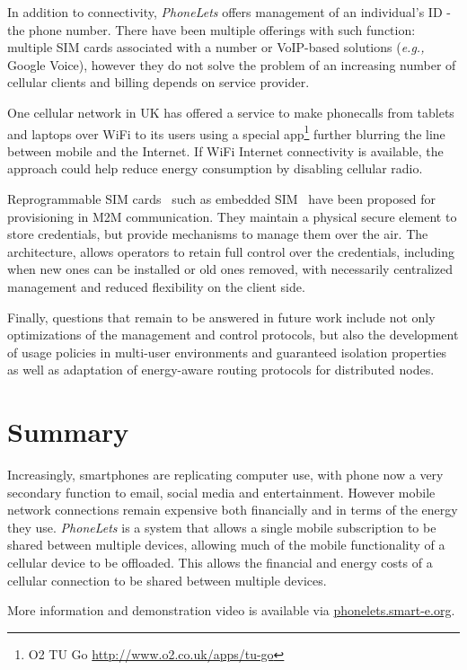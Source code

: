 \documentclass{sig-alternate-10pt}
\providecommand{\eg}{\emph{e.g.,} }
\begin{document}
In addition to connectivity, \emph{PhoneLets} offers management of an individual's ID - the phone number. There have been multiple offerings with such function: multiple SIM cards associated with a number or VoIP-based solutions (\eg Google Voice), however they do not solve the problem of an increasing number of cellular clients and billing depends on service provider.

One cellular network in UK has offered a service to make phonecalls from tablets and laptops over WiFi to its users using a special app\footnote{O2 TU Go \url{http://www.o2.co.uk/apps/tu-go}} further blurring the line between mobile and the Internet. If WiFi Internet connectivity is available, the approach could help reduce energy consumption by disabling cellular radio.

Reprogrammable SIM cards~\cite{OFcom:2012tx} such as embedded SIM~\cite{Association:2013ub} have been proposed for provisioning in M2M communication. They maintain a physical secure element to store credentials, but provide mechanisms to manage them over the air. The architecture, allows operators to retain full control over the credentials, including when new ones can be installed or old ones removed, with necessarily centralized management and reduced flexibility on the client side.

Finally, questions that remain to be answered in future work include not only optimizations of the management and control protocols, but also the development of usage policies in multi-user environments and guaranteed isolation properties as well as adaptation of energy-aware routing protocols for distributed nodes.

\section{Summary}

Increasingly, smartphones are replicating computer use, with phone now a very secondary function to email, social media and entertainment. However mobile network connections remain expensive both financially and in terms of the energy they use. \emph{PhoneLets} is a system that allows a single mobile subscription to be shared between multiple devices, allowing much of the mobile functionality of a cellular device to be offloaded. This allows the financial and energy costs of a cellular connection to be shared between multiple devices.

More information and demonstration video is available via \url{phonelets.smart-e.org}.
\end{document}
